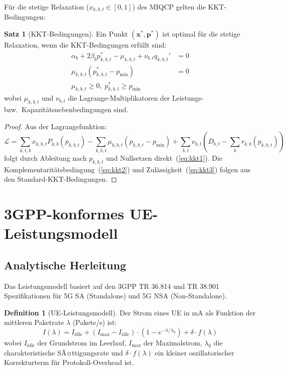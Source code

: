﻿\documentclass[a4paper,12pt]{article}
\theoremstyle{definition}
\newtheorem{definition}{Definition}
\newtheorem{satz}{Satz}
\begin{document}
F\"ur die stetige Relaxation ($x_{k,b,t} \in [0,1]$) des MIQCP gelten die
KKT-Bedingungen:

\begin{satz}[KKT-Bedingungen]
  Ein Punkt $(\mathbf{x}^*, \mathbf{p}^*)$ ist optimal f\"ur die stetige
  Relaxation, wenn die KKT-Bedingungen erf\"ullt sind:
  \begin{align}
    \alpha_b + 2\beta_b p^*_{k,b,t} - \mu_{k,b,t} + \nu_{b,t} q_{k,b,t}' &= 0 \label{eq:kkt1}\\
    \mu_{k,b,t} (p^*_{k,b,t} - p_{\min}) &= 0 \label{eq:kkt2}\\
    \mu_{k,b,t} \geq 0,\; p^*_{k,b,t} \geq p_{\min} &\label{eq:kkt3}
  \end{align}
  wobei $\mu_{k,b,t}$ und $\nu_{b,t}$ die Lagrange-Multiplikatoren der Leistungs- bzw.\
  Kapazit\"atsnebenbedingungen sind.
\end{satz}

\begin{proof}
  Aus der Lagrangefunktion:
  \[
    \mathcal{L} = \sum_{k,t,b} x_{k,b,t} P_{k,b}(p_{k,b,t})
    - \sum_{k,b,t} \mu_{k,b,t}(p_{k,b,t} - p_{\min})
    + \sum_{b,t} \nu_{b,t}\!\left(D_{b,t} - \sum_k r_{k,b}(p_{k,b,t})\right)
  \]
  folgt durch Ableitung nach $p_{k,b,t}$ und Nullsetzen direkt~(\ref{eq:kkt1}).
  Die Komplementarit\"atsbedingung~(\ref{eq:kkt2}) und Zul\"assigkeit~(\ref{eq:kkt3})
  folgen aus den Standard-KKT-Bedingungen.
\end{proof}

\section{3GPP-konformes UE-Leistungsmodell}
\label{sec:power}

\subsection{Analytische Herleitung}

Das Leistungsmodell basiert auf den 3GPP TR 36.814 und TR 38.901 Spezifikationen
f\"ur 5G SA (Standalone) und 5G NSA (Non-Standalone).

\begin{definition}[UE-Leistungsmodell]
  Der Strom eines UE in mA als Funktion der mittleren Paketrate $\lambda$ (Pakete/s) ist:
  \[
    I(\lambda) = I_{\mathrm{idle}} + (I_{\max} - I_{\mathrm{idle}}) \cdot
    \left(1 - e^{-\lambda / \lambda_0}\right) + \delta \cdot f(\lambda)
  \]
  wobei $I_{\mathrm{idle}}$ der Grundstrom im Leerlauf, $I_{\max}$ der Maximalstrom,
  $\lambda_0$ die charakteristische SÃ¤ttigungsrate und $\delta \cdot f(\lambda)$
  ein kleiner oszillatorischer Korrekturterm f\"ur Protokoll-Overhead ist.
\end{definition}
\end{document}
